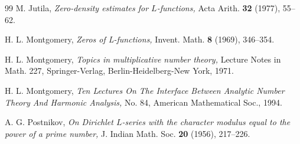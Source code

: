 \documentclass[12pt]{amsart}
\theoremstyle{definition}
\theoremstyle{plain}
\theoremstyle{remark}
\numberwithin{equation}{section}
\numberwithin{theorem}{section}
\numberwithin{equation}{section}
\begin{document}
\begin{thebibliography}{99}
		 M. Jutila,  \emph{Zero-density estimates for $L$-functions,} Acta Arith. \textbf{32} (1977),  55--62. 
		
		 H. L. Montgomery, \emph{Zeros of L-functions,} Invent. Math. \textbf{8} (1969),  346--354.
		
		 H. L. Montgomery, \emph{Topics in multiplicative number theory,} Lecture Notes in Math. 227, Springer-Verlag, Berlin-Heidelberg-New York, 1971.
		
		 H. L. Montgomery, \emph{Ten Lectures On The Interface Between Analytic Number Theory And
			Harmonic Analysis,}  No. 84, American Mathematical Soc., 1994.
		
		A. G. Postnikov, \emph{On Dirichlet $L$-series with the character modulus equal to the power of a prime number,}
		J. Indian Math. Soc. \textbf{20} (1956), 217--226.
		
		
	\end{thebibliography}
	
\end{document}
